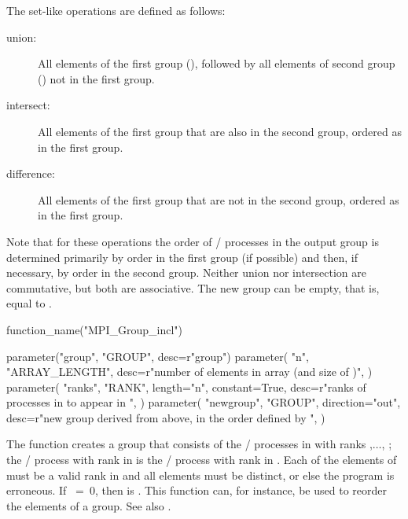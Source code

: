 \noindent The set-like operations are defined as follows:
\begin{description}
\item[union:] All elements of the first group (), followed by
all elements of second group () not in
the first group.
\item[intersect:] All elements of the first group that are also
in the second group, ordered as in the first group.
\item[difference:] All elements of the first group that are not
in the second group, ordered as in the first group.
\end{description}
Note that for these operations the order of \MPI/ processes in the output
group is determined primarily by order in the first group (if possible)
and then, if necessary, by order in the second group. Neither union nor
intersection are commutative, but both are associative. The new group can
be empty, that is, equal to .

%
\begin{mpi-binding}
    function_name("MPI_Group_incl")
    
    parameter("group", "GROUP", desc=r"group")
    parameter(
        "n",
        "ARRAY_LENGTH",
        desc=r"number of elements in array  (and size of )",
    )
    parameter(
        "ranks",
        "RANK",
        length="n",
        constant=True,
        desc=r"ranks of processes in  to appear in ",
    )
    parameter(
        "newgroup",
        "GROUP",
        direction="out",
        desc=r"new group derived from above, in the order defined by ",
    )
\end{mpi-binding}

The function  creates a group
 that consists of the  \MPI/ processes in
 with ranks ,$\ldots$, ;
the \MPI/ process with rank  in
 is the \MPI/ process with rank  in
. Each of the  elements of  must be a
valid rank in  and all elements must be distinct, or else the
program is erroneous. If $~=~0$, then  is
.
This function can, for instance, be used to reorder the
elements of a group. See also .

